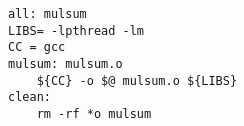 \begin{lstlisting}
all: mulsum
LIBS= -lpthread -lm
CC = gcc
mulsum: mulsum.o
	${CC} -o $@ mulsum.o ${LIBS}
clean:
	rm -rf *o mulsum

\end{lstlisting}